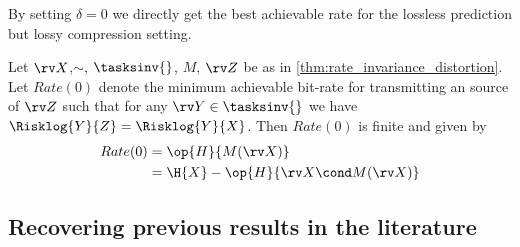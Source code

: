 \documentclass[final]{article}
\begin{document}
By setting $\delta=0$ we directly get the best achievable rate for the lossless prediction but lossy compression setting. 

\begin{corollary}\label{corr:invariant_source_coding}
Let $\rv X$,$\sim$, $\tasksinv{}$, $M$, $\rv Z$ be as in \cref{thm:rate_invariance_distortion}.
Let $Rate(0)$ denote the minimum achievable bit-rate for transmitting an \iid source of $\rv Z$ such that for any $\rv Y \in \tasksinv{}$ we have $\Risklog{Y}{Z} = \Risklog{Y}{X}$.
Then $Rate(0)$  is finite and given by
\begin{align}
Rate(0) &=   \op{H}{M(\rv X)} \\
&= \H{X} - \op{H}{\rv X \cond M(\rv X)} \label{corr:gains}
\end{align}
\end{corollary}

\subsection{Recovering previous results in the literature}
\label{appx:recovering}
\end{document}
